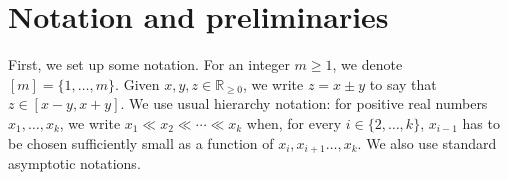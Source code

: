 \documentclass[reqno,a4paper]{amsart}
\theoremstyle{definition}
\newcommand{\eps}{\varepsilon}
\newcommand{\e}{\mathrm{e}}
\begin{document}


\section{Notation and preliminaries}\label{s: pre}
First, we set up some notation. For an integer $m\ge1$, we denote $[m]=\{1,\ldots,m\}$. Given $x,y,z\in\mathbb R_{\ge 0}$, we write $z=x\pm y$ to say that $z\in[x-y,x+y]$.
We use usual hierarchy notation: for positive real numbers $x_1,\ldots, x_k$, we write $x_1\ll x_2\ll\cdots\ll x_k$ when, for every $i\in \{2,\ldots ,k\}$, $x_{i-1}$ has to be chosen sufficiently small as a function of $x_i, x_{i+1}\ldots, x_k$. 
We also use standard asymptotic notations.
\end{document}
